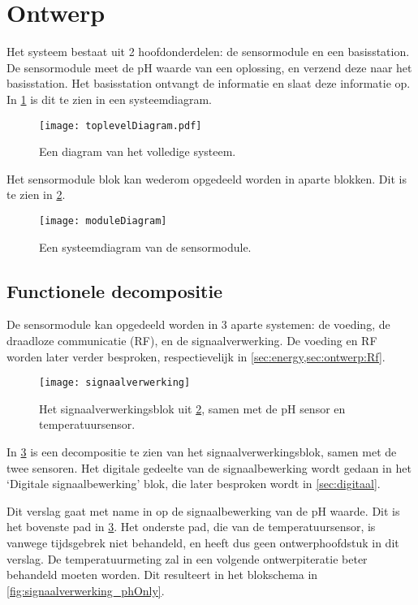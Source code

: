 \section{Ontwerp}\label{sec:ontwerp}
Het systeem bestaat uit 2 hoofdonderdelen: de sensormodule en een basisstation. De sensormodule meet de pH waarde van een oplossing, en verzend deze naar het basisstation. Het basisstation ontvangt de informatie en slaat deze informatie op.
In \cref{fig:functional} is dit te zien in een systeemdiagram.

\begin{figure}[!htbp]
    \centering
    \texttt{[image: toplevelDiagram.pdf]}
    \caption[short]{Een diagram van het volledige systeem.}
    \label{fig:functional}
\end{figure}

Het sensormodule blok kan wederom opgedeeld worden in aparte blokken. Dit is te zien in \cref{fig:moduleDiagram}.

\begin{figure}[!htbp]
    \centering
    \texttt{[image: moduleDiagram]}
    \caption{Een systeemdiagram van de sensormodule.}
    \label{fig:moduleDiagram}
\end{figure}

\subsection{Functionele decompositie}
De sensormodule kan opgedeeld worden in 3 aparte systemen: de voeding, de draadloze communicatie (RF), en de signaalverwerking. De voeding en RF worden later verder besproken, respectievelijk in \cref{sec:energy,sec:ontwerp:Rf}.

\begin{figure}[!htbp]
    \centering
    \texttt{[image: signaalverwerking]}
    \caption{Het signaalverwerkingsblok uit \cref{fig:moduleDiagram}, samen met de pH sensor en temperatuursensor.}
    \label{fig:analogeBewerkingsFunctie}
\end{figure}
In \cref{fig:analogeBewerkingsFunctie} is een decompositie te zien van het signaalverwerkingsblok, samen met de twee sensoren. Het digitale gedeelte van de signaalbewerking wordt gedaan in het `Digitale signaalbewerking' blok, die later besproken wordt in \cref{sec:digitaal}.

Dit verslag gaat met name in op de signaalbewerking van de pH waarde. Dit is het bovenste pad in \cref{fig:analogeBewerkingsFunctie}.
Het onderste pad, die van de temperatuursensor, is vanwege tijdsgebrek niet behandeld, en heeft dus geen ontwerphoofdstuk in dit verslag. De temperatuurmeting zal in een volgende ontwerpiteratie beter behandeld moeten worden. Dit resulteert in het blokschema in \cref{fig:signaalverwerking_phOnly}.

